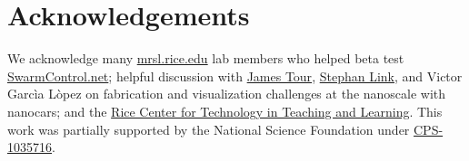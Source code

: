 \documentclass[letterpaper, 10 pt, conference]{ieeeconf}
\begin{document}



















    
    
\section{Acknowledgements}
We acknowledge many \href{http://mrsl.rice.edu/}{mrsl.rice.edu} lab members who helped beta test \href{http://www.swarmcontrol.net}{SwarmControl.net}; helpful discussion with \href{http://www.jmtour.com/}{James Tour}, \href{http://slink.rice.edu/}{Stephan Link}, and Victor Garc\`ia L\`opez on fabrication and visualization challenges at the nanoscale with nanocars; and the \href{http://cttl.rice.edu/}{Rice Center for Technology in Teaching and Learning}.
This work was partially supported by the National Science Foundation under 
\href{http://www.nsf.gov/awardsearch/showAward?AWD_ID=1035716}{CPS-1035716}.  
   

\end{document}
